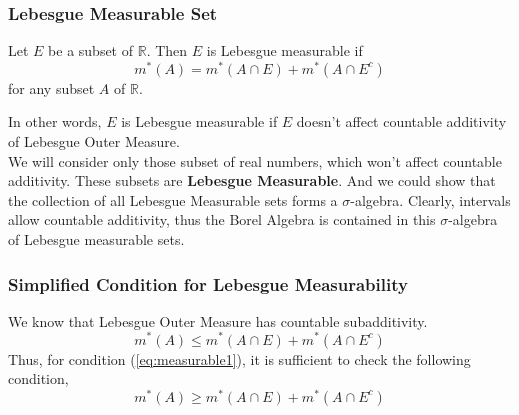 \subsubsection{Lebesgue Measurable Set}
\begin{definition}
	Let $E$ be a subset of $\mathbb{R}$.
	Then $E$ is Lebesgue measurable if
\begin{equation}
	m^\ast(A) = m^\ast(A \cap E) + m^\ast(A \cap E^c)
	\label{eq:measurable1}
\end{equation}
	for any subset $A$ of $\mathbb{R}$.
\end{definition}

	In other words, $E$ is Lebesgue measurable if $E$ doesn't affect countable additivity of Lebesgue Outer Measure.\\

	We will consider only those subset of real numbers, which won't affect countable additivity.
	These subsets are \textbf{Lebesgue Measurable}.
	And we could show that the collection of all Lebesgue Measurable sets forms a $\sigma$-algebra.
	Clearly, intervals allow countable additivity, thus the Borel Algebra is contained in this $\sigma$-algebra of Lebesgue measurable sets.
\subsubsection{Simplified Condition for Lebesgue Measurability}

We know that Lebesgue Outer Measure has countable subadditivity.
\begin{equation*}
	m^\ast(A) \le m^\ast(A \cap E) + m^\ast(A \cap E^c)
\end{equation*}
Thus, for condition (\ref{eq:measurable1}), it is sufficient to check the following condition,
\begin{equation}
	m^\ast(A) \ge m^\ast(A \cap E) + m^\ast(A \cap E^c)
	\label{eq:measurable2}
\end{equation}

